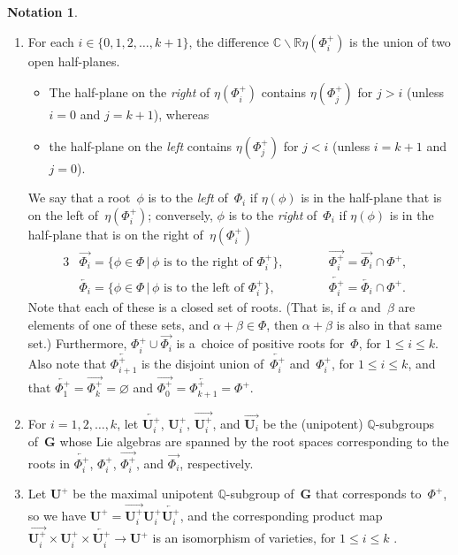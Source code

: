 \documentclass[11pt]{article}
\numberwithin{equation}{section}
\newcommand{\CC}{\mathbb{C}}
\newcommand{\QQ}{\mathbb{Q}}
\newcommand{\RR}{\mathbb{R}}
\newcommand{\Ga}{\mathbf{G}}
\newcommand{\Ua}{\mathbf{U}}
\newcommand{\ra}{\overrightarrow}
\newcommand{\la}{\overleftarrow}
\numberwithin{equation}{section}
\theoremstyle{definition}
\newtheorem{notation}[thm]{Notation}
\begin{document}
\begin{notation}
\begin{enumerate}
\item For each $i \in \{0,1,2,\ldots,k+1\}$, the difference $\CC \smallsetminus \RR \eta(\Phi^+_i)$ is the union of two open half-planes.
\begin{itemize}\itemsep=0pt
\item The half-plane on the \emph{right} of $\eta(\Phi^+_i)$ contains $\eta(\Phi^+_j)$ for $j > i$ (unless $i = 0$ and $j = k+1$), whereas
\item the half-plane on the \emph{left} contains $\eta(\Phi^+_j)$ for $j < i$ (unless $i = k + 1$ and $j = 0$).
\end{itemize}
We say that a root~$\phi$ is to the \emph{left} of~$\Phi_i$ if $\eta(\phi)$ is in the half-plane that is on the left of~$\eta(\Phi^+_i)$; conversely, $\phi$ is to the \emph{right} of~$\Phi_i$ if $\eta(\phi)$ is in the half-plane that is on the right of~$\eta(\Phi^+_i)$
		\begin{alignat*}{3}
		& \ra{\Phi_i}= \{ \phi \in \Phi \,|\, \text{$\phi$ is to the right of $\Phi^+_i$} \},
		\qquad &&
		\ra{\Phi^+_i}= \ra{\Phi_i} \cap \Phi^+,& \\
		&\la{\Phi_i}= \{ \phi \in \Phi \,|\, \text{$\phi$ is to the left of $\Phi^+_i$} \},
		\qquad &&
		\la{\Phi^+_i}= \la{\Phi_i} \cap \Phi^+		.&
\end{alignat*}
Note that each of these is a closed set of roots. (That is, if $\alpha$ and~$\beta$ are elements of one of these sets, and $\alpha + \beta \in \Phi$, then $\alpha + \beta$ is also in that same set.)
Furthermore, $\Phi_i^+ \cup \ra{\Phi_i}$ is a~choice of positive roots for~$\Phi$, for $1 \le i \le k$.
Also note that $\la{\Phi^+_{i+1}}$ is the disjoint union of~$\la{\Phi^+_i}$ and~$\Phi^+_i$, for $1 \le i \le k$, and that
	 $\la{\Phi^+_1} = \ra{\Phi^+_k} = \varnothing$ and $\ra{\Phi^+_0} = \la{\Phi^+_{k+1}} = \Phi^+$.
\item For $i = 1,2,\ldots,k$, let $\la{\Ua_i^+}$, $\Ua_i^+$, $\ra{\Ua_i^+}$, and $\ra{\Ua_i}$ be the (unipotent) $\QQ$-subgroups of~$\Ga$ whose Lie algebras are spanned by the root spaces corresponding to the roots in $\la{\Phi_i^+}$, $\Phi_i^+$, $\ra{\Phi_i^+}$, and $\ra{\Phi_i}$, respectively.
\item Let $\Ua^+$ be the maximal unipotent $\QQ$-subgroup of~$\Ga$ that corresponds to~$\Phi^+$, so we have $\Ua^+ = \ra{\Ua_i^+} \Ua^+_i \la{\Ua_i^+}$, and the corresponding product map $\ra{\Ua_i^+} \times \Ua^+_i \times \la{\Ua_i^+} \to \Ua^+$ is an isomorphism of varieties, for $1 \le i \le k$ \cite[Proposition~3.11, pp.~77--78]{BorelTits-GrpRed}.
	

\end{enumerate}
\end{notation}
\end{document}
